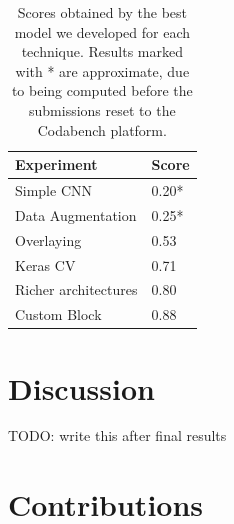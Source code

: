 \documentclass[11pt]{article}
\begin{document}
\begin{multicols}{2}
      \label{tab:results}
      \begin{table}[H]
          \centering
          \setlength{\tabcolsep}{3pt}
          \caption{Scores obtained by the best model we developed for each technique.
                   Results marked with * are approximate, due to being computed before
                   the submissions reset to the Codabench platform.}
          \begin{tabularx}{\linewidth}{lY}
              \toprule
              Experiment & Score \\
              \midrule
              Simple CNN & 0.20* \\
              Data Augmentation & 0.25* \\
              Overlaying & 0.53 \\
              Keras CV & 0.71 \\
              Richer architectures & 0.80 \\
              Custom Block & 0.88 \\
              \bottomrule
          \end{tabularx}
          \label{tb:Measurements}
      \end{table}

      \section{Discussion}

      TODO: write this after final results

      \section{Contributions}


\end{multicols}
\end{document}
